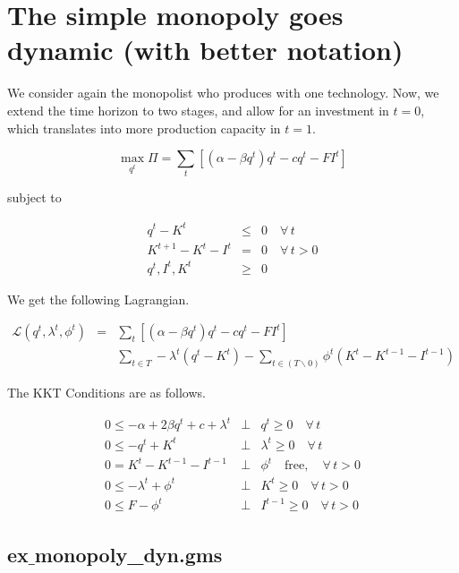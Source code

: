 \documentclass[11pt,a4paper]{article}
\begin{document}



\section{The simple monopoly goes dynamic (with better notation)}
\label{sec:simple-monopoly-goes}

We consider again the monopolist who produces with one technology. Now, we extend the time horizon to two stages, and allow for an investment in $t=0$, which translates into more production capacity in $t=1$.

\begin{equation*}
	\max_{q^t}\Pi = \sum_t\left[(\alpha-\beta q^t)q^t - cq^t  -FI^t\right]
\end{equation*}

subject to

\begin{eqnarray*}
	q^t - K^t &\leq& 0\quad \forall \,t\\
        K^{t+1} - K^t - I^t &=& 0 \quad \forall \, t>0\\
	q^t,I^t,K^t &\geq& 0 
\end{eqnarray*}
 
We get the following Lagrangian.

\begin{eqnarray*}
	\mathcal{L}(q^t,\lambda^t,\phi^t)&=& \sum_t\left[(\alpha-\beta q^t)q^t - cq^t  -FI^t\right] \\
        && \sum_{t\in T}- \lambda^t(q^t-K^t) - \sum_{t\in (T\backslash 0)}\phi^t(K^{t}-K^{t-1}-I^{t-1})
\end{eqnarray*}

The KKT Conditions are as follows.
 
\begin{eqnarray*}
	0 \leq -\alpha + 2\beta q^t + c + \lambda^t &\bot& q^t \geq 0 \quad\forall\,t\\
	0 \leq -q^t + K^t &\bot& \lambda^t \geq 0 \quad\forall\,t\\
        0 = K^{t} - K^{t-1} - I^{t-1} &\bot& \phi^t \quad \mbox{free}, \quad\forall\,t>0 \\
        0 \leq -\lambda^t + \phi^t &\bot& K^t \geq 0  \quad\forall\,t>0 \\
        0 \leq F - \phi^t &\bot& I^{t-1} \geq 0  \quad\forall\,t>0
\end{eqnarray*}


\subsection*{ex$\_$monopoly\_dyn.gms}
\end{document}
